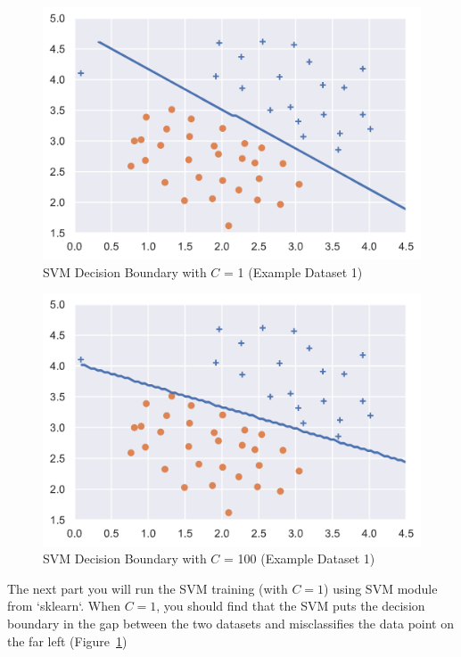 \documentclass[12pt]{article}
\begin{document}
\begin{figure}[h!]
  \centering
  \includegraphics[scale=0.6]{c1.png}
  \caption{SVM Decision Boundary with $C$ = 1 (Example Dataset 1)}
  \label{fig:c1}
\end{figure}

\begin{figure}[h!]
  \centering
  \includegraphics[scale=0.6]{c100.png}
  \caption{SVM Decision Boundary with $C$ = 100 (Example Dataset 1)}
  \label{fig:c100}
\end{figure}

The next part you will run the SVM training (with $C = 1$) using SVM module from `sklearn`.  When $C = 1$, you should find that the SVM puts the decision boundary in the gap between the two datasets and misclassifies the data point on the far left (Figure~\ref{fig:c1})

\end{document}
